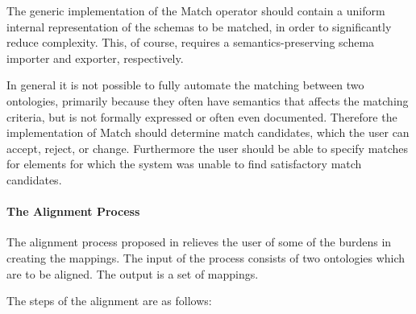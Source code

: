 The generic implementation of the Match operator should contain a
uniform internal representation of the schemas to be matched, in order
to significantly reduce complexity. This, of course, requires a
semantics-preserving schema importer and exporter, respectively. 

In general it is not possible to fully automate the matching between two
ontologies, primarily because they often have semantics that affects
the matching criteria, but is not formally expressed or often even
documented. Therefore the implementation of Match should determine
match candidates, which the user can accept, reject, or change.
Furthermore the user should be able to specify matches for elements for
which the system was unable to find satisfactory match candidates. 

\paragraph{The Alignment Process}
The alignment process proposed in \cite{debruin2005wsml} relieves the user of
some of the burdens in creating the mappings. The input of the process
consists of two ontologies which are to be aligned. The output is a set
of mappings. 

The steps of the alignment are as follows: 

